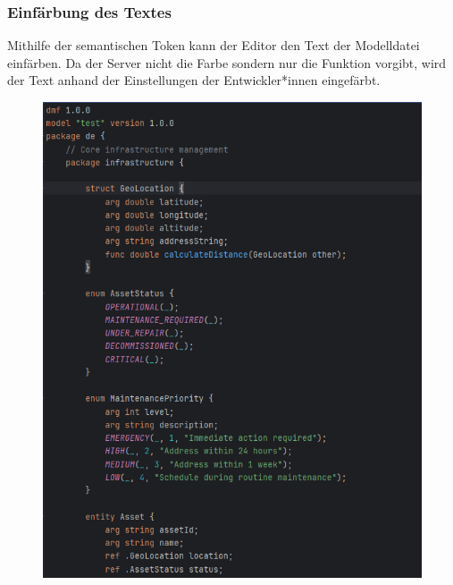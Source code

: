 \documentclass[./einleitung.tex]{subfiles}
\begin{document}
    \subsubsection{Einfärbung des Textes}\label{subsubsec:useSemanticTokens}
    Mithilfe der semantischen Token kann der Editor den Text der Modelldatei einfärben.
    Da der Server nicht die Farbe sondern nur die Funktion vorgibt, wird der Text anhand der Einstellungen der Entwickler*innen eingefärbt.
    \begin{figure}[H]
        \centering
        \includegraphics[width=\linewidth / 2 - 1em]{bilder/semanticIntellij}

\end{figure}
\end{document}
